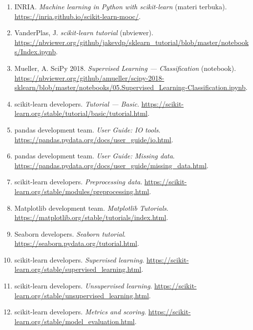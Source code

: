 \documentclass[12pt,a4paper]{article}
\begin{document}
\begin{enumerate}[leftmargin=*]
  \item INRIA. \textit{Machine learning in Python with scikit-learn} (materi terbuka). \url{https://inria.github.io/scikit-learn-mooc/}.

  \item VanderPlas, J. \textit{scikit-learn tutorial} (nbviewer). \url{https://nbviewer.org/github/jakevdp/sklearn_tutorial/blob/master/notebooks/Index.ipynb}.

  \item Mueller, A. SciPy 2018. \textit{Supervised Learning --- Classification} (notebook). \url{https://nbviewer.org/github/amueller/scipy-2018-sklearn/blob/master/notebooks/05.Supervised_Learning-Classification.ipynb}.

  \item scikit-learn developers. \textit{Tutorial --- Basic}. \url{https://scikit-learn.org/stable/tutorial/basic/tutorial.html}.

  \item pandas development team. \textit{User Guide: IO tools}. \url{https://pandas.pydata.org/docs/user_guide/io.html}.

  \item pandas development team. \textit{User Guide: Missing data}. \url{https://pandas.pydata.org/docs/user_guide/missing_data.html}.

  \item scikit-learn developers. \textit{Preprocessing data}. \url{https://scikit-learn.org/stable/modules/preprocessing.html}.

  \item Matplotlib development team. \textit{Matplotlib Tutorials}. \url{https://matplotlib.org/stable/tutorials/index.html}.

  \item Seaborn developers. \textit{Seaborn tutorial}. \url{https://seaborn.pydata.org/tutorial.html}.

  \item scikit-learn developers. \textit{Supervised learning}. \url{https://scikit-learn.org/stable/supervised_learning.html}.

  \item scikit-learn developers. \textit{Unsupervised learning}. \url{https://scikit-learn.org/stable/unsupervised_learning.html}.

  \item scikit-learn developers. \textit{Metrics and scoring}. \url{https://scikit-learn.org/stable/model_evaluation.html}.


\end{enumerate}
\end{document}
